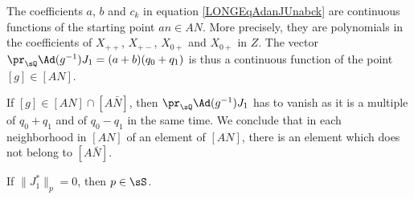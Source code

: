 \begin{remark}        \label{LONGRemANANbarYapas}
    The coefficients $a$, $b$ and $c_k$ in equation \eqref{LONGEqAdanJUnabck} are continuous functions of the starting point $an\in AN$. More precisely, they are polynomials in the coefficients of $X_{++}$, $X_{+-}$, $X_{0+}$ and $X_{0+}$ in $Z$. The vector $\pr_{\sQ}\Ad(g^{-1})J_1=(a+b)(q_0+q_1)$ is thus a continuous function of the point $[g]\in[AN]$.

    If $[g]\in[AN]\cap[A\bar N]$, then $\pr_{\sQ}\Ad(g^{-1})J_1$ has to vanish as it is a multiple of $q_0+q_1$ and of $q_0-q_1$ in the same time. We conclude that in each neighborhood in $[AN]$ of an element of $[AN]$, there is an element which does not belong to $[A\bar N]$.
\end{remark}

\begin{proposition}
    If $\| J_1^* \|_p=0$, then $p\in\sS$.
\end{proposition}

